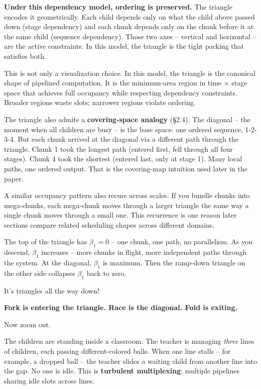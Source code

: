 \documentclass[
  11pt,
]{article}
\begin{document}
\textbf{Under this dependency model, ordering is preserved.} The
triangle encodes it geometrically. Each child depends only on what the
child above passed down (stage dependency) and each chunk depends only
on the chunk before it at the same child (sequence dependency). Those
two axes -- vertical and horizontal -- are the active constraints. In
this model, the triangle is the tight packing that satisfies both.

This is not only a visualization choice. In this model, the triangle is
the canonical shape of pipelined computation. It is the minimum-area
region in time × stage space that achieves full occupancy while
respecting dependency constraints. Broader regions waste slots; narrower
regions violate ordering.

The triangle also admits a \textbf{covering-space analogy} (§2.4). The
diagonal -- the moment when all children are busy -- is the base space:
one ordered sequence, 1-2-3-4. But each chunk arrived at the diagonal
via a different path through the triangle. Chunk 1 took the longest path
(entered first, fell through all four stages). Chunk 4 took the shortest
(entered last, only at stage 1). Many local paths, one ordered output.
That is the covering-map intuition used later in the paper.

A similar occupancy pattern also recurs across scales. If you bundle
chunks into mega-chunks, each mega-chunk moves through a larger triangle
the same way a single chunk moves through a small one. This recurrence
is one reason later sections compare related scheduling shapes across
different domains.

The top of the triangle has \(\beta_1 = 0\) -- one chunk, one path, no
parallelism. As you descend, \(\beta_1\) increases -- more chunks in
flight, more independent paths through the system. At the diagonal,
\(\beta_1\) is maximum. Then the ramp-down triangle on the other side
collapses \(\beta_1\) back to zero.

It's triangles all the way down!

\textbf{Fork is entering the triangle. Race is the diagonal. Fold is
exiting.}

Now zoom out.

The children are standing inside a classroom. The teacher is managing
\emph{three} lines of children, each passing different-colored balls.
When one line stalls -- for example, a dropped ball -- the teacher
slides a waiting child from another line into the gap. No one is idle.
This is \textbf{turbulent multiplexing}: multiple pipelines sharing idle
slots across lines.
\end{document}
